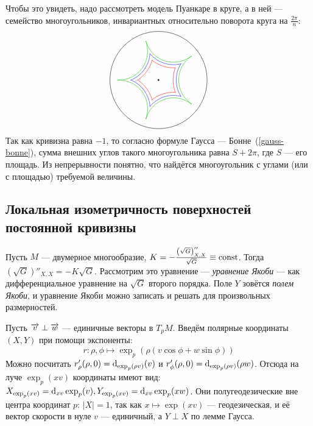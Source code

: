 \documentclass[a4paper]{report}
\begin{document}
{{{            Чтобы это увидеть, надо рассмотреть модель Пуанкаре в круге, а в ней --- семейство многоугольников, инвариантных относительно поворота круга на $\frac{2\pi}{n}$:
            \[\begin{tikzpicture}
                  \draw (0, 0) circle (2);
                  \fill (0, 0) circle (1pt);
                  \pgfmathsetmacro{\r}{1.4} %
                  \foreach \i in {0,1,...,4} {
                      \draw[red,smooth,domain={(2.2+\i)*72}:{(2.8+\i)*72}] plot ({\r*cos(\x)+2*cos(72*\i)}, {\r*sin(\x)+2*sin(72*\i)});
                  }
                  \pgfmathsetmacro{\r}{1.27} %
                  \foreach \i in {0,1,...,4} {
                    \draw[blue,smooth,domain={(2.05+\i)*72}:{(2.95+\i)*72}] plot ({\r*cos(\x)+2*cos(72*\i)}, {\r*sin(\x)+2*sin(72*\i)});
                  }
                  \pgfmathsetmacro{\r}{1.17} %
                  \foreach \i in {0,1,...,4} {
                    \draw[darkgreen,smooth,domain={(1.7+\i)*72}:{(3.3+\i)*72}] plot ({\r*cos(\x)+2*cos(72*\i)}, {\r*sin(\x)+2*sin(72*\i)});
                  }
            \end{tikzpicture}\]
            Так как кривизна равна $-1$, то согласно формуле Гаусса --- Бонне~(\cref{gauss-bonne}), сумма внешних углов такого многоугольника равна $S+2\pi$, где $S$ --- его площадь.
            Из непрерывности понятно, что найдётся многоугольник с углами (или с площадью) требуемой величины.\qedhere
            }
        }
    }
    \subsection{Локальная изометричность поверхностей постоянной кривизны}
    Пусть $M$ --- двумерное многообразие, $K = -\frac{\left(\sqrt{G}\right)''_{X,X}}{\sqrt{G}} \equiv \operatorname{const}$.
    Тогда $\left(\sqrt{G}\right)''_{X,X} = -K \sqrt{G}$.
    Рассмотрим это уравнение --- \emph{уравнение Якоби} --- как дифференциальное уравнение на $\sqrt{G}$ второго порядка.
    Поле $Y$ зовётся \emph{полем Якоби}, и уравнение Якоби можно записать и решать для произвольных размерностей.

    Пусть $\overrightarrow{v} \perp \overrightarrow{w}$ --- единичные векторы в $T_p M$.
    Введём полярные координаты $(X, Y)$ при помощи экспоненты:
    \[r: \rho, \phi \mapsto \exp_p(\rho(v \cos \phi + w \sin \phi))\]
    Можно посчитать $r'_{\rho}(\rho, 0) = \operatorname{d}\!_{\exp_p(\rho v)}(v)$ и $r'_{\phi}(\rho, 0) = \operatorname{d}\!_{\exp_p(\rho v)}(\rho w)$.
    Отсюда на луче $\exp_p(x{v})$ координаты имеют вид: $X_{\exp_p(x{v})} = \operatorname{d}\!_{xv}\exp_p(v), Y_{\exp_p(x{v})} = \operatorname{d}\!_{xv}\exp_p(xw)$.
    Они полугеодезические вне центра координат $p$: $|X| = 1$, так как $ x \mapsto \exp(xv)$ --- геодезическая, и её вектор скорости в нуле $v$ --- единичный, а $Y \perp X$ по лемме Гаусса.
\end{document}
